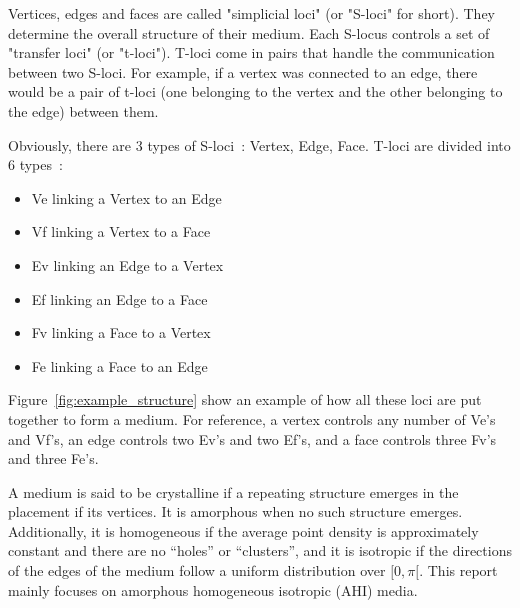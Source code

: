 \documentclass{article}
\begin{document}
Vertices, edges and faces are called "simplicial loci" (or "S-loci" for short). They determine the overall structure of their medium. Each S-locus controls a set of "transfer loci" (or "t-loci"). T-loci come in pairs that handle the communication between two S-loci. For example, if a vertex was connected to an edge, there would be a pair of t-loci (one belonging to the vertex and the other belonging to the edge) between them.

Obviously, there are 3 types of S-loci~: Vertex, Edge, Face. T-loci are divided into 6 types~: 
\begin{itemize}[noitemsep,nosep]
	\item Ve linking a  Vertex to an Edge
	\item Vf linking a  Vertex to a  Face
	\item Ev linking an Edge   to a  Vertex
	\item Ef linking an Edge   to a  Face
	\item Fv linking a  Face   to a  Vertex
	\item Fe linking a  Face   to an Edge
\end{itemize}
Figure~\ref{fig:example_structure} show an example of how all these loci are put together to form a medium. For reference, a vertex controls any number of Ve's and Vf's, an edge controls two Ev's and two Ef's, and a face controls three Fv's and three Fe's.

A medium is said to be crystalline if a repeating structure emerges in the placement if its vertices. It is amorphous when no such structure emerges. Additionally, it is homogeneous if the average point density is approximately constant and there are no
“holes” or “clusters”, and it is isotropic if the directions of the edges of the medium follow a uniform distribution over $[0, \pi[$. This report mainly focuses on amorphous homogeneous isotropic (AHI) media.
\end{document}
